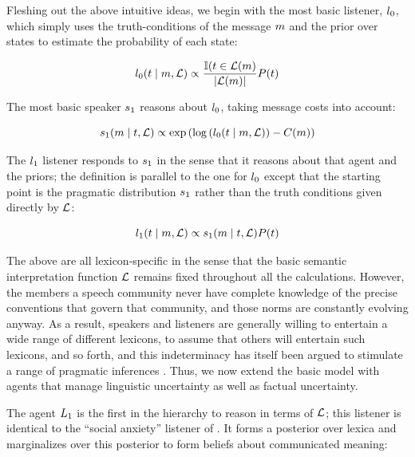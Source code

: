 Fleshing out the above intuitive ideas, we begin with the most basic
listener, $\listenerZero$, which simply uses the truth-conditions of
the message $m$ and the prior over states to estimate the
probability of each state:

\begin{definition}[$\listenerZero$]\label{def:l0}
  \[
  l_{0}(t \mid m, \mathcal{L}) 
  \propto
  \frac{\mathbb{I}(t \in \mathcal{L}(m)}{|\mathcal{L}(m)|}
  P(t)
  \]
\end{definition}

The most basic speaker $\speakerOne$ reasons about $\listenerZero$,
taking message costs into account:

\begin{definition}[$\speakerOne$]\label{def:s1}  
  \[
  s_{1}(m \mid t, \mathcal{L}) 
  \propto
  \exp
  \left(
    \log
    \left(l_{0}(t \mid m, \mathcal{L})\right) 
    - C(m)
  \right)
  \]
\end{definition}

The $\listenerOne$ listener responds to $\speakerOne$ in the sense
that it reasons about that agent and the priors; the definition is
parallel to the one for $\listenerZero$ except that the starting point
is the pragmatic distribution $\speakerOne$ rather than the truth
conditions given directly by $\mathcal{L}$:

\begin{definition}[$\listenerOne$]\label{def:l1}
  \[
  l_{1}(t \mid m, \mathcal{L}) 
  \propto 
  s_{1}(m \mid t, \mathcal{L})P(t)
  \]
\end{definition}

The above are all lexicon-specific in the sense that the basic
semantic interpretation function $\mathcal{L}$ remains fixed throughout all
the calculations.  However, the members a speech community never have
complete knowledge of the precise conventions that govern that
community, and those norms are constantly evolving anyway. As a
result, speakers and listeners are generally willing to entertain a
wide range of different lexicons, to assume that others will entertain
such lexicons, and so forth, and this indeterminacy has itself been
argued to stimulate a range of pragmatic inferences
\cite{Bergen:Goodman:Levy:2012,Bergen:Goodman:2014}. Thus, we now
extend the basic model with agents that manage linguistic uncertainty
as well as factual uncertainty.

The agent $L_{1}$ is the first in the hierarchy to reason in
terms of $\mathcal{L}$; this listener is identical to the ``social anxiety''
listener of \cite{Smith:Goodman:Frank:2013}. It forms a posterior over
lexica and marginalizes over this posterior to form beliefs about
communicated meaning:

